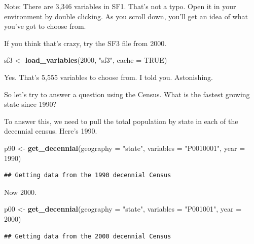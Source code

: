 \documentclass[]{book}
\newenvironment{Shaded}{\begin{snugshade}}{\end{snugshade}}
\newcommand{\DataTypeTok}[1]{\textcolor[rgb]{0.13,0.29,0.53}{#1}}
\newcommand{\DecValTok}[1]{\textcolor[rgb]{0.00,0.00,0.81}{#1}}
\newcommand{\KeywordTok}[1]{\textcolor[rgb]{0.13,0.29,0.53}{\textbf{#1}}}
\newcommand{\NormalTok}[1]{#1}
\newcommand{\OtherTok}[1]{\textcolor[rgb]{0.56,0.35,0.01}{#1}}
\newcommand{\StringTok}[1]{\textcolor[rgb]{0.31,0.60,0.02}{#1}}
\begin{document}
Note: There are 3,346 variables in SF1. That's not a typo. Open it in your environment by double clicking. As you scroll down, you'll get an idea of what you've got to choose from.

If you think that's crazy, try the SF3 file from 2000.

\begin{Shaded}
\begin{Highlighting}[]
\NormalTok{sf3 <-}\StringTok{ }\KeywordTok{load_variables}\NormalTok{(}\DecValTok{2000}\NormalTok{, }\StringTok{"sf3"}\NormalTok{, }\DataTypeTok{cache =} \OtherTok{TRUE}\NormalTok{)}
\end{Highlighting}
\end{Shaded}

Yes. That's 5,555 variables to choose from. I told you. Astonishing.

So let's try to answer a question using the Census. What is the fastest growing state since 1990?

To answer this, we need to pull the total population by state in each of the decennial census. Here's 1990.

\begin{Shaded}
\begin{Highlighting}[]
\NormalTok{p90 <-}\StringTok{ }\KeywordTok{get_decennial}\NormalTok{(}\DataTypeTok{geography =} \StringTok{"state"}\NormalTok{, }\DataTypeTok{variables =} \StringTok{"P0010001"}\NormalTok{, }\DataTypeTok{year =} \DecValTok{1990}\NormalTok{)}
\end{Highlighting}
\end{Shaded}

\begin{verbatim}
## Getting data from the 1990 decennial Census
\end{verbatim}

Now 2000.

\begin{Shaded}
\begin{Highlighting}[]
\NormalTok{p00 <-}\StringTok{ }\KeywordTok{get_decennial}\NormalTok{(}\DataTypeTok{geography =} \StringTok{"state"}\NormalTok{, }\DataTypeTok{variables =} \StringTok{"P001001"}\NormalTok{, }\DataTypeTok{year =} \DecValTok{2000}\NormalTok{)}
\end{Highlighting}
\end{Shaded}

\begin{verbatim}
## Getting data from the 2000 decennial Census
\end{verbatim}
\end{document}
